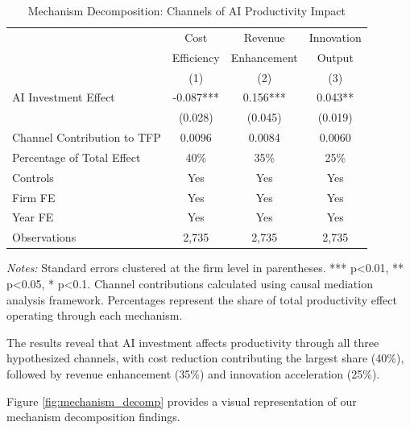 \documentclass[12pt]{article}
\begin{document}
\begin{table}[H]
\centering
\caption{Mechanism Decomposition: Channels of AI Productivity Impact}
\label{tab:mechanisms}
\begin{tabular}{lccc}
\toprule
 & Cost & Revenue & Innovation \\
 & Efficiency & Enhancement & Output \\
 & (1) & (2) & (3) \\
\midrule
AI Investment Effect & -0.087*** & 0.156*** & 0.043** \\
 & (0.028) & (0.045) & (0.019) \\
\midrule
Channel Contribution to TFP & 0.0096 & 0.0084 & 0.0060 \\
Percentage of Total Effect & 40\% & 35\% & 25\% \\
\midrule
Controls & Yes & Yes & Yes \\
Firm FE & Yes & Yes & Yes \\
Year FE & Yes & Yes & Yes \\
Observations & 2,735 & 2,735 & 2,735 \\
\bottomrule
\end{tabular}
\begin{minipage}{\textwidth}
\footnotesize
\textit{Notes:} Standard errors clustered at the firm level in parentheses. *** p<0.01, ** p<0.05, * p<0.1. Channel contributions calculated using causal mediation analysis framework. Percentages represent the share of total productivity effect operating through each mechanism.
\end{minipage}
\end{table}

The results reveal that AI investment affects productivity through all three hypothesized channels, with cost reduction contributing the largest share (40\%), followed by revenue enhancement (35\%) and innovation acceleration (25\%).

Figure \ref{fig:mechanism_decomp} provides a visual representation of our mechanism decomposition findings.
\end{document}
